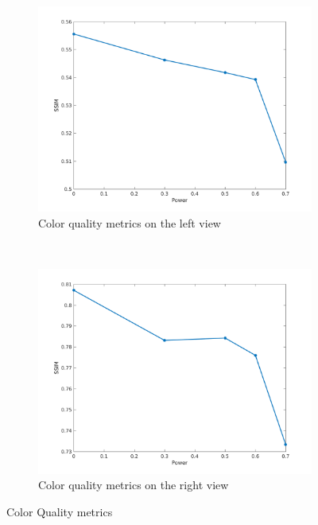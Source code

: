 \begin{figure}[h!]
    \centering
    \begin{subfigure}[t]{0.5\textwidth}
        \centering
\includegraphics[width=1\textwidth]{./img/qm_left.png}
          \caption{\small{Color quality metrics on the left view}}
\label{fig:qmcl}

    \end{subfigure}%
    ~ 
    \begin{subfigure}[t]{0.5\textwidth}
        \centering
\includegraphics[width=1\textwidth]{./img/qm_disp_left.png}
           \caption{\small{Color quality metrics on the right view}}
\label{fig:qmdl}
    \end{subfigure}
    \caption{Color Quality metrics}
    \label{fig:qml}
\end{figure}


